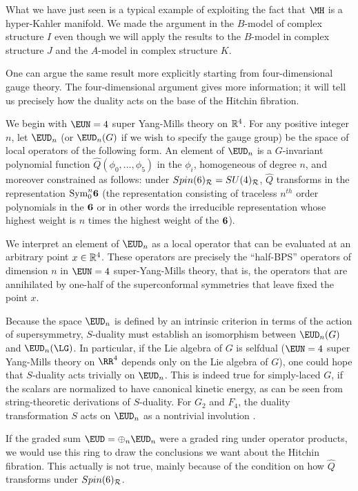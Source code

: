 What we have just seen is a typical example of exploiting the fact
that $\MH$ is a hyper-Kahler manifold.  We made the argument in
the $B$-model of complex structure $I$ even though we will apply
the results to the $B$-model in complex structure $J$ and the
$A$-model in complex structure $K$.

 One can argue the same result more explicitly
starting from four-dimensional gauge theory. The four-dimensional
argument gives more information; it will tell us precisely how the
duality acts on the base of the Hitchin fibration.

We begin with ${\EUN}=4$ super Yang-Mills theory
 on $\Bbb{R}^4$. For any positive integer $n$, let ${\EUD}_n$
(or $\EUD_n(G)$ if we wish to specify the gauge group) be the
space of local operators of the following form. An element of
${\EUD}_n$ is a $G$-invariant polynomial function ${\hat
Q}(\phi_0,\dots,\phi_5)$ in the $\phi_i$, homogeneous of degree
$n$, and moreover  constrained as follows: under $Spin(6)_{\cal
R}=SU(4)_{\cal R}$, $\hat Q$ transforms in the representation
${\rm Sym}_0^n{\bf 6}$ (the representation consisting of traceless
$n^{th}$ order polynomials in the ${\bf 6}$ or in other words the
irreducible representation whose highest weight is $n$ times the
highest weight of the ${\bf 6}$).

We interpret an element of ${\EUD}_n$ as a local operator that can
be evaluated at an arbitrary point $x\in \Bbb{R}^4$.  These
operators are precisely the  ``half-BPS'' operators of  dimension
$n$ in ${\EUN}=4$ super-Yang-Mills theory, that is, the operators
that are annihilated by one-half of the superconformal symmetries
that leave  fixed the point $x$.

Because the space ${\EUD}_n$ is defined by an intrinsic criterion
in terms of the action of supersymmetry, $S$-duality must
establish an isomorphism between $\EUD_n(G)$ and $\EUD_n(\LG)$. In
particular, if the Lie algebra of $G$ is selfdual (${\EUN}=4$
super Yang-Mills theory on $\RR^4$ depends only on the Lie algebra
of $G$), one could hope that $S$-duality acts trivially on
${\EUD}_n$. This is indeed true for simply-laced $G$, if the
scalars are normalized to have canonical kinetic energy, as can be
seen from string-theoretic derivations of $S$-duality. For $G_2$
and $F_4$, the duality transformation $S$ acts on ${\EUD}_n$ as a
nontrivial involution \cite{ref47}.

If the graded sum ${\EUD}=\oplus_n {\EUD}_n$ were  a graded ring
under operator products, we would use this ring to draw the
conclusions we want about the Hitchin fibration.  This actually is
not true, mainly because of the condition on how $\hat Q$
transforms under $Spin(6)_{\cal R}$.

